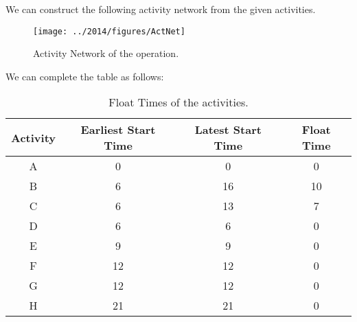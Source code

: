 %
%

\begin{subquestions}


\subquestion

\begin{subsubquestions}
	
\subsubquestion

We can construct the following activity network from the given activities.
\begin{figure}[H]
	\begin{center}
		\texttt{[image: ../2014/figures/ActNet]}
		\caption{\label{2014:q2:fig:ActNet} Activity Network of the operation.}
	\end{center}
\end{figure}


\subsubquestion

We can complete the table as follows:
\begin{table}[H]
	\centering
	\begin{tabular}{|c|c|c|c|}
		\hline
		Activity&Earliest Start Time&Latest Start Time&Float Time\\
		\hline
		A & 0 & 0 & 0 \\
		B & 6 & 16 & 10 \\
		C & 6 & 13 & 7 \\
		D & 6 & 6 & 0 \\
		E & 9 & 9 & 0 \\
		F & 12 & 12 & 0 \\
		G & 12 & 12 & 0 \\
		H & 21 & 21 & 0  \\
		\hline
		
	\end{tabular}
\caption{\label{2014:tab:Act} Float Times of the activities.}
\end{table}


\end{subsubquestions}
\end{subquestions}
